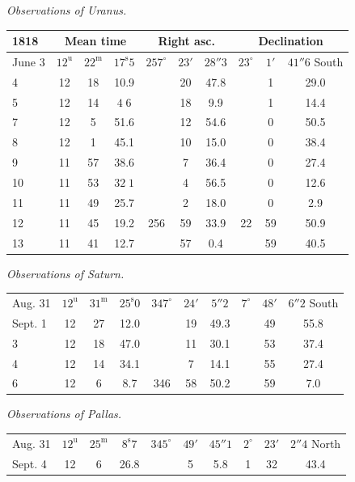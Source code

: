 \begin{center}
\emph{Observations of Uranus.}

\setlength{\tabcolsep}{2.2pt}\begin{tabular}{l|ccc|ccc|ccc}
\hline
1818 & \multicolumn{3}{c|}{Mean time} & \multicolumn{3}{c|}{Right asc.} & \multicolumn{3}{c}{Declination} \\
\hline
June 3 & $12^{\mathrm u}$ & $22^{\mathrm m}$ & $17^{\mathrm s}5$ & $257^\circ$ & $23'$ & $28''3$ & $23^\circ$ & $1'$ & $41''6$ South \\ 
4 & 12 & 18 & 10.9 & & 20 & 47.8 & & 1 & 29.0 \\
5 & 12 & 14 & $4\;6$ & & 18 & 9.9 & & 1 & 14.4 \\
7 & 12 & 5 & 51.6 & & 12 & 54.6 & & 0 & 50.5 \\ 
8 & 12 & 1 & 45.1 & & 10 & 15.0 & & 0 & 38.4 \\
9 & 11 & 57 & 38.6 & & 7 & 36.4 & & 0 & 27.4 \\
10 & 11 & 53 & $32\;1$ & & 4 & 56.5 & & 0 & 12.6 \\
11 & 11 & 49 & 25.7 & & 2 & 18.0 & & 0 & 2.9 \\
12 & 11 & 45 & 19.2 & 256 & 59 & 33.9 & 22 & 59 & 50.9 \\
13 & 11 & 41 & 12.7 & & 57 & 0.4 & & 59 & 40.5 \\
\hline
\end{tabular}
\end{center}

\begin{center}
\emph{Observations of Saturn.}

\setlength{\tabcolsep}{2.2pt}\begin{tabular}{l|ccc|ccc|ccc}
\hline
Aug. 31 & $12^{\mathrm u}$ & $31^{\mathrm m}$ & $25^{\mathrm s}0$ & $347^\circ$ & $24'$ & $5''2$ & $7^\circ$ & $48'$ & $6''2$ South \\
Sept. 1 & 12 & 27 & 12.0 & & 19 & 49.3 & & 49 & 55.8 \\
3 & 12 & 18 & 47.0 & & 11 & 30.1 & & 53 & 37.4 \\
4 & 12 & 14 & 34.1 & & 7 & 14.1 & & 55 & 27.4 \\
6 & 12 & 6 & 8.7 & 346 & 58 & 50.2 & & 59 & 7.0 \\
\hline
\end{tabular}
\end{center}

\begin{center}
\emph{Observations of Pallas.}

\setlength{\tabcolsep}{2.2pt}\begin{tabular}{l|ccc|ccc|ccc}
\hline
Aug. 31 & $12^{\mathrm u}$ & $25^{\mathrm m}$ & $8^{\mathrm s}7$ & $345^\circ$ & $49'$ & $45''1$ & $2^\circ$ & $23'$ & $2''4$ North \\
Sept. 4 & 12 & 6 & 26.8 & & 5 & 5.8 & 1 & 32 & 43.4 \\
\hline
\end{tabular}
\end{center}

